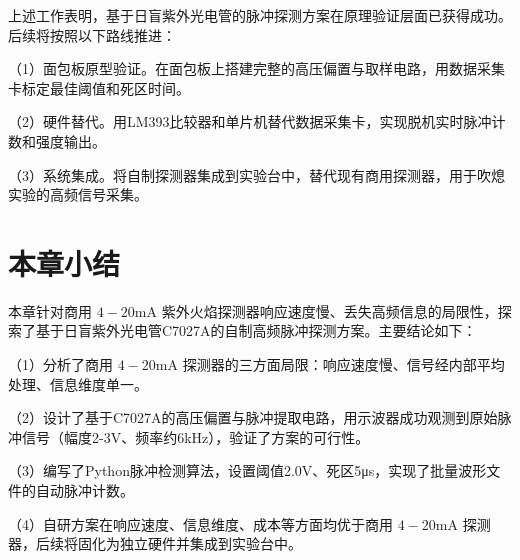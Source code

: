 上述工作表明，基于日盲紫外光电管的脉冲探测方案在原理验证层面已获得成功。后续将按照以下路线推进：

（1）面包板原型验证。在面包板上搭建完整的高压偏置与取样电路，用数据采集卡标定最佳阈值和死区时间。

（2）硬件替代。用LM393比较器和单片机替代数据采集卡，实现脱机实时脉冲计数和强度输出。

（3）系统集成。将自制探测器集成到实验台中，替代现有商用探测器，用于吹熄实验的高频信号采集。

\section{本章小结}

本章针对商用 \(4-20\mathrm{mA}\) 紫外火焰探测器响应速度慢、丢失高频信息的局限性，探索了基于日盲紫外光电管C7027A的自制高频脉冲探测方案。主要结论如下：

（1）分析了商用 \(4-20\mathrm{mA}\) 探测器的三方面局限：响应速度慢、信号经内部平均处理、信息维度单一。

（2）设计了基于C7027A的高压偏置与脉冲提取电路，用示波器成功观测到原始脉冲信号（幅度2-3V、频率约6kHz），验证了方案的可行性。

（3）编写了Python脉冲检测算法，设置阈值2.0V、死区5μs，实现了批量波形文件的自动脉冲计数。

（4）自研方案在响应速度、信息维度、成本等方面均优于商用 \(4-20\mathrm{mA}\) 探测器，后续将固化为独立硬件并集成到实验台中。